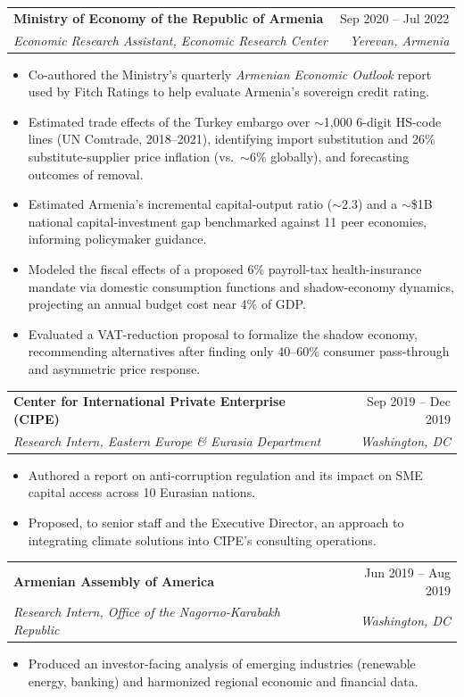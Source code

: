 \documentclass[10pt,letterpaper]{article}
\makeatletter
\newcommand{\entryspace}{3pt}         %
\newcommand{\entry}[4]{%
  \vspace{\entryspace}%
  \noindent\begin{tabularx}{\linewidth}{@{}X r@{}}
    \textbf{#1} & #2 \\
    \textit{#3} & \textit{#4} \\
  \end{tabularx}%
  \vspace{1pt}%
}
\makeatother
\begin{document}
\entry{Ministry of Economy of the Republic of Armenia}{Sep 2020 -- Jul 2022}{Economic Research Assistant, Economic Research Center}{Yerevan, Armenia}
\begin{itemize}
  \item Co-authored the Ministry's quarterly \textit{Armenian Economic Outlook} report used by Fitch Ratings to help evaluate Armenia's sovereign credit rating.
  \item Estimated trade effects of the Turkey embargo over $\sim$1{,}000 6-digit HS-code lines (UN Comtrade, 2018--2021), identifying import substitution and 26\% substitute-supplier price inflation (vs.\ $\sim$6\% globally), and forecasting outcomes of removal.
  \item Estimated Armenia's incremental capital-output ratio ($\sim$2.3) and a $\sim$\$1B national capital-investment gap benchmarked against 11 peer economies, informing policymaker guidance.
  \item Modeled the fiscal effects of a proposed 6\% payroll-tax health-insurance mandate via domestic consumption functions and shadow-economy dynamics, projecting an annual budget cost near 4\% of GDP.
  \item Evaluated a VAT-reduction proposal to formalize the shadow economy, recommending alternatives after finding only 40--60\% consumer pass-through and asymmetric price response.
\end{itemize}

\entry{Center for International Private Enterprise (CIPE)}{Sep 2019 -- Dec 2019}{Research Intern, Eastern Europe \& Eurasia Department}{Washington, DC}
\begin{itemize}
  \item Authored a report on anti-corruption regulation and its impact on SME capital access across 10 Eurasian nations.
  \item Proposed, to senior staff and the Executive Director, an approach to integrating climate solutions into CIPE's consulting operations.
\end{itemize}

\entry{Armenian Assembly of America}{Jun 2019 -- Aug 2019}{Research Intern, Office of the Nagorno-Karabakh Republic}{Washington, DC}
\begin{itemize}
  \item Produced an investor-facing analysis of emerging industries (renewable energy, banking) and harmonized regional economic and financial data.
\end{itemize}
\end{document}
